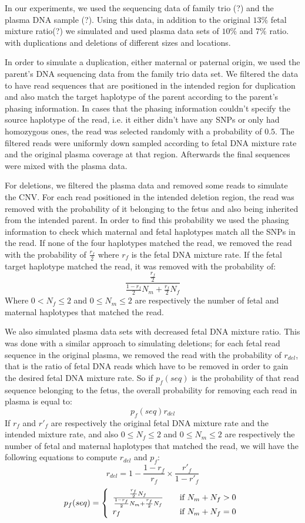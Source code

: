 \documentclass[10pt,a4paper]{article}
\begin{document}
	In our experiments, we used the sequencing data of family trio (?) and the plasma DNA sample (?). Using this data, in addition to the original $13\%$ fetal mixture ratio(?) we simulated and used plasma data sets of $10\%$ and $7\%$ ratio. with duplications and deletions of different sizes and locations.

	In order to simulate a duplication, either maternal or paternal origin, we used the parent's DNA sequencing data from the family trio data set. We filtered the data to have read sequences that are positioned in the intended region for duplication and also match the target haplotype of the parent according to the parent's phasing information.	In cases that the phasing information couldn't specify the source haplotype of the read, i.e. it either didn't have any SNPs or only had homozygous ones, the read was selected randomly with a probability of $0.5$. The filtered reads were uniformly down sampled according to fetal DNA mixture rate and the original plasma coverage at that region. Afterwards the final sequences were mixed with the plasma data.
	
	For deletions, we filtered the plasma data and removed some reads to simulate the CNV. For each read positioned in the intended deletion region, the read was removed with the probability of it belonging to the fetus and also being inherited from the intended parent. In order to find this probability we used the phasing information to check which maternal and fetal haplotypes match all the SNPs in the read. If none of the four haplotypes matched the read, we removed the read with the probability of $\frac{r_f}{2}$ where $r_f$ is the fetal DNA mixture rate. If the fetal target haplotype matched the read, it was removed with the probability of:
	$$\frac{ \frac{r_f}{2} } { \frac{1-r_f}{2} N_m + \frac{r_f}{2} N_f}$$
	Where $0 < N_f \leq 2$ and $0 \leq N_m \leq 2$ are respectively the number of fetal and maternal haplotypes that matched the read.
	
	We also simulated plasma data sets with decreased fetal DNA mixture ratio. This was done with a similar approach to simulating deletions; for each fetal read sequence in the original plasma, we removed the read with the probability of $r_{del}$, that is the ratio of fetal DNA reads which have to be removed in order to gain the desired fetal DNA mixture rate. So if $p_f(seq)$ is the probability of that read sequence belonging to the fetus, the overall probability for removing each read in plasma is equal to:
	 $$p_f(seq)r_{del}$$
	 If $r_f$ and $r'_f$ are respectively the original fetal DNA mixture rate and the intended mixture rate, and also $0 \leq N_f \leq 2$ and $0 \leq N_m \leq 2$ are respectively the number of fetal and maternal haplotypes that matched the read, we will have the following equations to compute $r_{del}$ and $p_f$:
	 $$r_{del}= 1 - \frac{1 - r_f } { r_f} \times \frac{r'_f}{1-r'_f}$$
	$$ p_f(seq) = \left\{ 
  \begin{array}{l l}
    \frac{ \frac{r_f}{2}N_f } { \frac{1-r_f}{2} N_m + \frac{r_f}{2} N_f} & \quad \text{if $N_m+N_f>0$}\\
    r_f & \quad \text{if $N_m+N_f=0$}
  \end{array} \right.$$	 

	 	 
 
\end{document}
